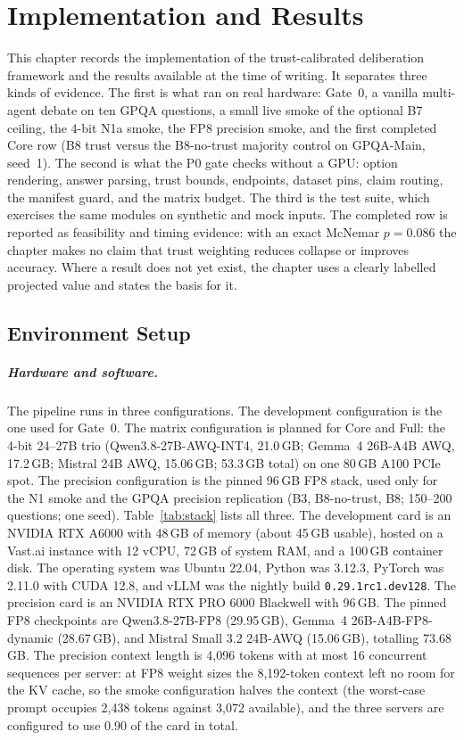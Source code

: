 \chapter{Implementation and Results}\label{chapter:implementation}

This chapter records the implementation of the trust-calibrated deliberation framework and the results available at the time of writing. It separates three kinds of evidence. The first is what ran on real hardware: Gate~0, a vanilla multi-agent debate on ten GPQA questions, a small live smoke of the optional B7 ceiling, the 4-bit N1a smoke, the FP8 precision smoke, and the first completed Core row (B8 trust versus the B8-no-trust majority control on GPQA-Main, seed~1). The second is what the P0 gate checks without a GPU: option rendering, answer parsing, trust bounds, endpoints, dataset pins, claim routing, the manifest guard, and the matrix budget. The third is the test suite, which exercises the same modules on synthetic and mock inputs. The completed row is reported as feasibility and timing evidence: with an exact McNemar $p=0.086$ the chapter makes no claim that trust weighting reduces collapse or improves accuracy. Where a result does not yet exist, the chapter uses a clearly labelled projected value and states the basis for it.

\section{Environment Setup}\label{sec:environment-setup}

\paragraph*{Hardware and software.}
The pipeline runs in three configurations. The development configuration is the one used for Gate~0. The matrix configuration is planned for Core and Full: the 4-bit 24--27B trio (Qwen3.8-27B-AWQ-INT4, 21.0\,GB; Gemma~4 26B-A4B AWQ, 17.2\,GB; Mistral 24B AWQ, 15.06\,GB; 53.3\,GB total) on one 80\,GB A100 PCIe spot. The precision configuration is the pinned 96\,GB FP8 stack, used only for the N1 smoke and the GPQA precision replication (B3, B8-no-trust, B8; 150--200 questions; one seed). Table~\ref{tab:stack} lists all three. The development card is an NVIDIA RTX A6000 with 48\,GB of memory (about 45\,GB usable), hosted on a Vast.ai instance with 12 vCPU, 72\,GB of system RAM, and a 100\,GB container disk. The operating system was Ubuntu 22.04, Python was 3.12.3, PyTorch was 2.11.0 with CUDA 12.8, and vLLM was the nightly build \texttt{0.29.1rc1.dev128}. The precision card is an NVIDIA RTX PRO 6000 Blackwell with 96\,GB. The pinned FP8 checkpoints are Qwen3.8-27B-FP8 (29.95\,GB), Gemma~4 26B-A4B-FP8-dynamic (28.67\,GB), and Mistral Small 3.2 24B-AWQ (15.06\,GB), totalling 73.68\,GB. The precision context length is 4{,}096 tokens with at most 16 concurrent sequences per server: at FP8 weight sizes the 8{,}192-token context left no room for the KV cache, so the smoke configuration halves the context (the worst-case prompt occupies 2{,}438 tokens against 3{,}072 available), and the three servers are configured to use 0.90 of the card in total.

